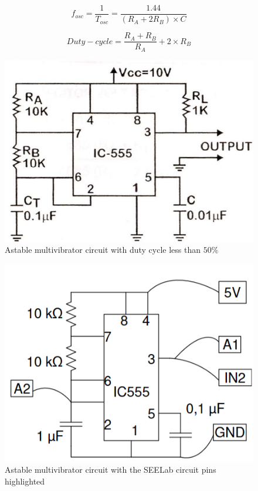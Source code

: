     \begin{equation}
        f_{osc} = \frac{1}{T_{osc}} = \frac{1.44}{(R_A + 2R_B)\times C}
        \label{eq:2}
    \end{equation}

    \begin{equation}
        Duty-cycle = \frac{R_A+R_B}{R_A} + 2\times R_B
        \label{eq:3}
    \end{equation}

    \begin{figure}[H]
        \centering
        \includegraphics[width=0.8\columnwidth]{images/ast.png}
        \caption{Astable multivibrator circuit with duty cycle less than $50\%$}
        \label{th:4}
    \end{figure}

    \begin{figure}[H]
        \centering
        \includegraphics[width=0.7\columnwidth]{images/th5555.png}
        \caption{Astable multivibrator circuit with the SEELab circuit pins highlighted}
        \label{th:5}
    \end{figure}
